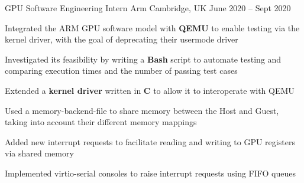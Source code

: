 \begin{cventries}
  \cventry
    {GPU Software Engineering Intern} %
    {Arm} %
    {Cambridge, UK} %
    {June 2020 -- Sept 2020} %
    {
      \begin{cvitems} %
        \item Integrated the ARM GPU software model with \textbf{QEMU} to enable testing via the kernel driver, with the goal of deprecating their usermode driver
        \item Investigated its feasibility by writing a \textbf{Bash} script to automate testing and comparing execution times and the number of passing test cases
        \item Extended a \textbf{kernel driver} written in \textbf{C} to allow it to interoperate with QEMU
        \item Used a memory-backend-file to share memory between the Host and Guest, taking into account their different memory mappings
        \item Added new interrupt requests to facilitate reading and writing to GPU registers via shared memory
        \item Implemented virtio-serial consoles to raise interrupt requests using FIFO queues 
      \end{cvitems}
    }







\end{cventries}
